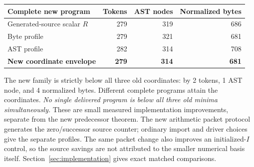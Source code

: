 \begin{center}\small
\begin{tabular}{lrrr}
\toprule
Complete new program & Tokens & AST nodes & Normalized bytes\\
\midrule
Generated-source scalar $R$ &279&319&686\\
Byte profile &279&321&681\\
AST profile &282&314&708\\
\midrule
\textbf{New coordinate envelope} &\textbf{279}&\textbf{314}&\textbf{681}\\
\bottomrule
\end{tabular}
\end{center}

The new family is strictly below all three old coordinates: by 2 tokens,
1 AST node, and 4 normalized bytes. Different complete programs attain
the coordinates. \emph{No single delivered program is below all three
old minima simultaneously.} These are small measured implementation
improvements, separate from the new predecessor theorem. The new
arithmetic packet protocol generates the zero/successor source counter;
ordinary import and driver choices give the separate profiles.
The same packet change also improves an initialized-$I$ control, so the
source savings are not attributed to the smaller numerical basis itself.
Section~\ref{sec:implementation} gives exact matched comparisons.

